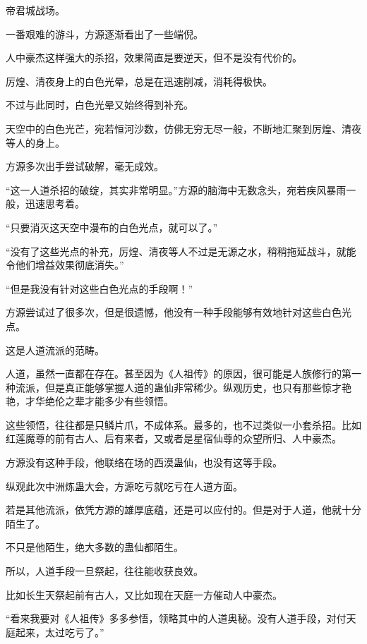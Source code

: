 
\begin{this_body}



帝君城战场。

一番艰难的游斗，方源逐渐看出了一些端倪。

人中豪杰这样强大的杀招，效果简直是要逆天，但不是没有代价的。

厉煌、清夜身上的白色光晕，总是在迅速削减，消耗得极快。

不过与此同时，白色光晕又始终得到补充。

天空中的白色光芒，宛若恒河沙数，仿佛无穷无尽一般，不断地汇聚到厉煌、清夜等人的身上。

方源多次出手尝试破解，毫无成效。

“这一人道杀招的破绽，其实非常明显。”方源的脑海中无数念头，宛若疾风暴雨一般，迅速思考着。

“只要消灭这天空中漫布的白色光点，就可以了。”

“没有了这些光点的补充，厉煌、清夜等人不过是无源之水，稍稍拖延战斗，就能令他们增益效果彻底消失。”

“但是我没有针对这些白色光点的手段啊！”

方源尝试过了很多次，但是很遗憾，他没有一种手段能够有效地针对这些白色光点。

这是人道流派的范畴。

人道，虽然一直都在存在。甚至因为《人祖传》的原因，很可能是人族修行的第一种流派，但是真正能够掌握人道的蛊仙非常稀少。纵观历史，也只有那些惊才艳艳，才华绝伦之辈才能多少有些领悟。

这些领悟，往往都是只鳞片爪，不成体系。最多的，也不过类似一小套杀招。比如红莲魔尊的前有古人、后有来者，又或者是星宿仙尊的众望所归、人中豪杰。

方源没有这种手段，他联络在场的西漠蛊仙，也没有这等手段。

纵观此次中洲炼蛊大会，方源吃亏就吃亏在人道方面。

若是其他流派，依凭方源的雄厚底蕴，还是可以应付的。但是对于人道，他就十分陌生了。

不只是他陌生，绝大多数的蛊仙都陌生。

所以，人道手段一旦祭起，往往能收获良效。

比如长生天祭起前有古人，又比如现在天庭一方催动人中豪杰。

“看来我要对《人祖传》多多参悟，领略其中的人道奥秘。没有人道手段，对付天庭起来，太过吃亏了。”


\end{this_body}
